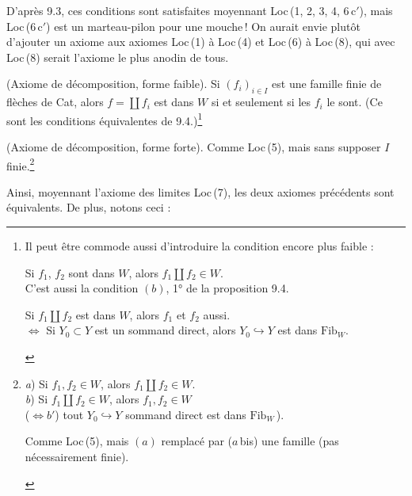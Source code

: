 \documentclass[11pt]{article}
\newcommand{\msp}[1]{\marginpar{\raggedright\footnotesize [#1]}}
\newcommand{\Fib}{\mathrm{Fib}}
\begin{document}
\msp{page 124}

D'après 9.3, ces conditions sont satisfaites moyennant Loc\,(1, 2, 3, 4, 6\,c$'$), mais Loc\,(6\,c$'$) est un marteau-pilon pour une mouche\,! On aurait envie plutôt d'ajouter un axiome aux axiomes Loc\,(1) à Loc\,(4) et Loc\,(6) à Loc\,(8), qui avec Loc\,(8) serait l'axiome le plus anodin de tous.

\begin{description}[labelwidth=5.5em,leftmargin=6.5em,style=sameline]
\item[Loc\,(5)] (Axiome de décomposition, forme faible). Si $(f_i)_{i\in I}$ est une famille finie de flèches de Cat, alors $f=\coprod f_i$ est dans $W$ si et seulement si les $f_i$ le sont. (Ce sont les conditions équivalentes de 9.4.)\footnote[48]{Il peut être commode aussi d'introduire la condition encore plus faible :
\begin{description}[nosep,labelwidth=4.5em,leftmargin=5em,style=sameline]
\item[Loc\,(5\,a)] Si $f_1$, $f_2$ sont dans $W$, alors $f_1\amalg f_2\in W$.\\
C'est aussi la condition $(b)$, 1° de la proposition 9.4.
\item[Loc\,(5\,b)] Si $f_1\amalg f_2$ est dans $W$, alors $f_1$ et $f_2$ aussi.\\
$\iff$ Si $Y_0\subset Y$ est un sommand direct, alors $Y_0\hookrightarrow Y$ est dans $\Fib_W$.
\end{description}}

\item[Loc\,(5\,bis)] (Axiome de décomposition, forme forte). Comme Loc\,(5), mais sans supposer $I$ finie.\footnote[49]{
\begin{description}[nosep,labelwidth=4.5em,leftmargin=5em,style=sameline]
\item[Loc\,(5)] \textit{a}) Si $f_1,f_2\in W$, alors $f_1\amalg f_2\in W$.\\
\textit{b}) Si $f_1\amalg f_2\in W$, alors $f_1,f_2\in W$\\
($\iff b'$) tout $Y_0\hookrightarrow Y$ sommand direct est dans $\Fib_W$\,).
\item[Loc\,(5\,bis)] Comme Loc\,(5), mais $(a)$ remplacé par ($a$\,bis) une famille (pas nécessairement finie).
\end{description}}
\end{description}

Ainsi, moyennant l'axiome des limites Loc\,(7), les deux axiomes précédents sont équivalents. De plus, notons ceci :
\end{document}
